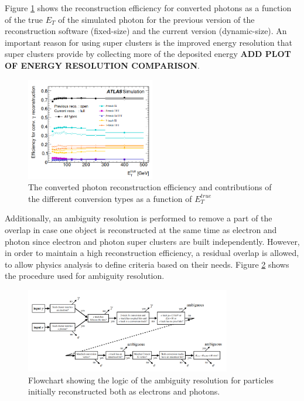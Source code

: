 Figure \ref{fig:chap2:Objects:Egamma:Gamma:Conv:Reco:Eff} shows the reconstruction efficiency for converted photons as a function of the true $E_T$ of the simulated photon for the previous version of the reconstruction software (fixed-size) and the current version (dynamic-size). An important reason for using super clusters is the improved energy resolution that super clusters provide by collecting more of the deposited energy \textbf{ADD PLOT OF ENERGY RESOLUTION COMPARISON}.
\begin{figure}[H]
    \centering
    \includegraphics[width=0.5\textwidth]{Ch2/Img/Photon_conv_Reco_Eff.png}
    \caption{The converted photon reconstruction efficiency and contributions of the different conversion types as a function of $E^{true}_T$}
    \label{fig:chap2:Objects:Egamma:Gamma:Conv:Reco:Eff}
\end{figure}

Additionally, an ambiguity resolution is performed to remove a part of the overlap in case one object is reconstructed at the same time as electron and photon since electron and photon super clusters are built independently. However, in order to maintain a high reconstruction efficiency, a residual overlap is allowed, to allow physics analysis to define criteria based on their needs. Figure \ref{fig:chap2:Objects:Egamma:Ambg} shows the procedure used for ambiguity resolution. 
\begin{figure}[H]
    \centering
    \includegraphics[width=0.8\textwidth]{Ch2/Img/Ambiguity.png}
    \caption{Flowchart showing the logic of the ambiguity resolution for particles initially reconstructed both as electrons and photons.}
    \label{fig:chap2:Objects:Egamma:Ambg}
\end{figure}

